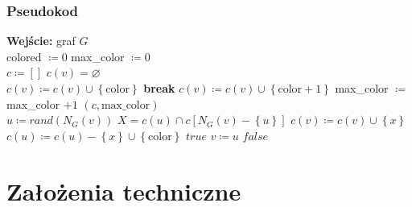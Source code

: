 \documentclass[10pt,a4paper]{article}
\begin{document}
	\subsubsection{Pseudokod}
	
	\begin{algorithmic}
		\State \textbf{Wejście:} graf $G$ \\
		\State colored $\coloneqq 0$
		\State max\_color $\coloneqq 0$
		\\
			\State $c \coloneqq \left[\right]$
				\State $c(v) = \varnothing$
			\EndFor
			\\
						\State $c(v) \coloneqq c(v) \cup \left\{\text{color}\right\}$
						\State \textbf{break}
					\EndIf
				\EndFor
					\State $c(v) \coloneqq c(v) \cup \left\{\text{color} + 1\right\}$
					\State max\_color $\coloneqq$ max\_color $+ 1$
				\EndIf
			\EndFor
			\State \Return $(c, \text{max\_color})$
		\EndFunction
		\\
				\State $u \coloneqq rand(N_{G}(v))$
				\State $X = c(u) \cap c[N_{G}(v) - \left\{u\right\}]$
							\State $c(v) \coloneqq c(v) \cup \left\{x\right\}$
							\State $c(u) \coloneqq c(u) - \left\{x\right\} \cup \left\{\text{color}\right\}$
							\State \Return $true$
						\EndIf
					\EndFor
				\EndFor
				\State $v \coloneqq u$
			\EndFor
			\State \Return $false$
		\EndProcedure
	\end{algorithmic}	
	
	\section{Założenia techniczne}
	
\end{document}
